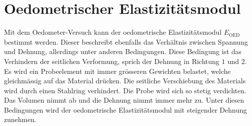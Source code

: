 \section{Oedometrischer Elastizitätsmodul\label{spannung:section:Oedometrischer Elastizitätsmodul}}
Mit dem Oedometer-Versuch kann der oedometrische Elastizitätsmodul $E_{\text{OED}}$ bestimmt werden.
%
%
%
Dieser beschreibt ebenfalls das Verhältnis zwischen Spannung und Dehnung, allerdings unter anderen Bedingungen.
Diese Bedingung ist das Verhindern der seitlichen Verformung, sprich der Dehnung in Richtung $1$ und $2$.
Es wird ein Probeelement mit immer grösseren Gewichten belastet, welche gleichmässig auf das Material drücken.
Die seitliche Verschiebung des Materials wird durch einen Stahlring verhindert.
Die Probe wird sich so stetig verdichten.
Das Volumen nimmt ab und die Dehnung nimmt immer mehr zu.
Unter diesen Bedingungen wird der oedometrische Elastizitätsmodul mit steigender Dehnung zunehmen.

